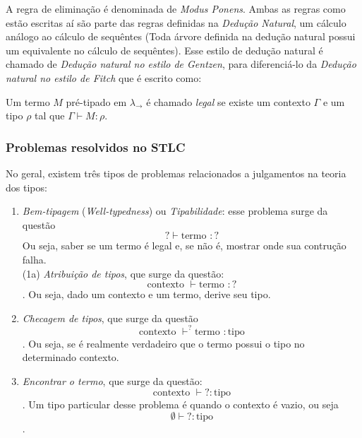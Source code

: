 \documentclass[../main.tex]{subfiles}
\begin{document}
A regra de eliminação é denominada de \emph{Modus Ponens}. Ambas as regras como estão escritas aí são parte das regras definidas na \emph{Dedução Natural}, um cálculo análogo ao cálculo de sequêntes (Toda árvore definida na dedução natural possui um equivalente no cálculo de sequêntes). Esse estilo de dedução natural é chamado de \emph{Dedução natural no estilo de Gentzen}, para diferenciá-lo da \emph{Dedução natural no estilo de Fitch} que é escrito como:


\begin{definition}
    Um termo $M$ pré-tipado em $\lambda_\to$ é chamado \emph{legal} se existe um contexto $\Gamma$ e um tipo $\rho$ tal que $\Gamma \vdash M : \rho$.
\end{definition}

\subsubsection{Problemas resolvidos no STLC}

No geral, existem três tipos de problemas relacionados a julgamentos na teoria dos tipos:

\begin{enumerate}
    \item \emph{Bem-tipagem} (\emph{Well-typedness}) ou \emph{Tipabilidade}: esse problema surge da questão $$? \vdash \text{termo } : ?$$ Ou seja, saber se um termo é legal e, se não é, mostrar onde sua contrução falha. \\
    (1a) \emph{Atribuição de tipos}, que surge da questão: $$\text{contexto } \vdash \text{termo } : ?$$. Ou seja, dado um contexto e um termo, derive seu tipo.
    \item \emph{Checagem de tipos}, que surge da questão $$\text{contexto } \vdash^{?} \text{termo } : \text{tipo}$$. Ou seja, se é realmente verdadeiro que o termo possui o tipo no determinado contexto.
    \item \emph{Encontrar o termo}, que surge da questão: $$\text{contexto } \vdash ? : \text{tipo}$$. Um tipo particular desse problema é quando o contexto é vazio, ou seja $$\emptyset \vdash ? : \text{tipo}$$. 
\end{enumerate}
\end{document}
